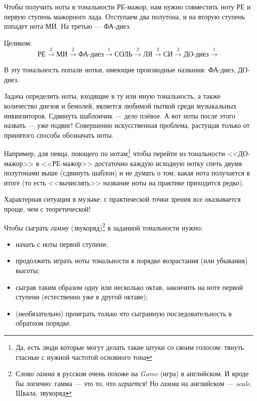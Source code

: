 \begin{Example}
    \label{ex:harmony:lad:d:maj}
    
    Чтобы получить ноты в тональности РЕ-мажор, нам нужно совместить ноту РЕ и первую ступень мажорного лада. Отступаем два полутона, и на вторую ступень попадет нота МИ. На третью --- ФА-диез.
    
    Целиком:
    \[
        \text{РЕ}\xrightarrow{2} 
        \text{МИ}\xrightarrow{2} 
        \text{ФА-диез}\xrightarrow{1} 
        \text{СОЛЬ}\xrightarrow{2} 
        \text{ЛЯ}\xrightarrow{2} 
        \text{СИ}\xrightarrow{2} 
        \text{ДО-диез}\xrightarrow{1}
    \]
    
    В эту тональность попали нотки, имеющие производные названия: ФА-диез, ДО-диез.
\end{Example}

Задача определить ноты, входящие в ту или иную тональность, а также количество диезов и бемолей, является любимой пыткой среди музыкальных инквизиторов. Сдвинуть шаблончик --- дело плёвое. А вот ноты после этого назвать --- уже подвиг! Совершенно искусственная проблема, растущая только от принятого способа обозначать ноты.

Например, для певца, поющего по нотам\footnote{Да, есть люди которые могут делать такие штуки со своим голосом: тянуть гласные с нужной частотой основного тона} чтобы перейти из тональности <<ДО-мажор>> в <<РЕ-мажор>> достаточно каждую исходную нотку спеть двумя полутонами выше (сдвинуть шаблон) и не думать о том, какая нота получается в итоге (то есть <<вычислять>> название ноты на практике приходится редко).

Характерная ситуация в музыке: с практической точки зрения все оказывается проще, чем с теоретической!

Чтобы сыграть \emph{гамму} (звукоряд)\footnote{Слово \emph{гамма} в русском очень похоже на \emph{Game} (игра) в английском. И вроде бы логично: гамма --- это то, что \emph{играется}! Но \emph{гамма} на английском --- \emph{scale}. Шкала, звукоряд} в заданной тональности нужно:
\begin{itemize}
    \item начать с ноты первой ступени;
    \item продолжить играть ноты тональности в порядке возрастания (или убывания) высоты;
    \item сыграв таким образом одну или несколько октав, закончить на ноте первой ступени (естественно уже в другой октаве); 
    \item (необязательно) проиграть только что сыгранную последовательность в обратном порядке.
\end{itemize}

